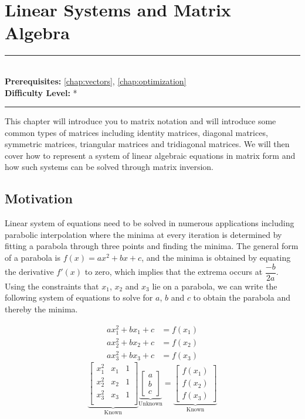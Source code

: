 \documentclass[book.tex]{subfiles}
\begin{document}
\chapter{Linear Systems and Matrix Algebra}
\label{chap:linear_systems}
\noindent\rule{11cm}{0.4pt} \\
\textbf{Prerequisites:} \autoref{chap:vectors}, \autoref{chap:optimization} \\
\textbf{Difficulty Level:} * \\
\noindent\rule{11cm}{0.4pt}
\vspace{5mm}

This chapter will introduce you to matrix notation and will introduce some common types of matrices including identity matrices, diagonal matrices, symmetric matrices, triangular matrices and tridiagonal matrices. We will then cover how to represent a system of linear algebraic equations in matrix form and how such systems can be solved through matrix inversion.

\section{Motivation}

Linear system of equations need to be solved in numerous applications including parabolic interpolation where the minima at every iteration is determined by fitting a parabola through three points and finding the minima. The general form of a parabola is  $f(x) = ax^2+bx+c$, and the minima is obtained by equating the derivative $f'(x)$ to zero, which implies that the extrema occurs at $\dfrac{-b}{2a}$.  Using the constraints that $x_1$, $x_2$ and $x_3$ lie on a parabola, we can write the following system of equations to solve for $a$, $b$ and $c$ to obtain the parabola and thereby the minima.

\begin{align}
ax_1^2 + bx_1 + c &= f(x_1)\\
ax_2^2 + bx_2 + c &= f(x_2)\\
ax_3^2 + bx_3 + c &= f(x_3)
\end{align}
\[	
\underbrace{
	\begin{bmatrix}
	x_1^2 & x_1 & 1 \\
	x_2^2 & x_2 & 1 \\
	x_3^2 & x_3 & 1 \\
	\end{bmatrix}}_{\text{Known}}
\underbrace{
	\begin{bmatrix}
	a\\
	b\\
	c
	\end{bmatrix}}_{\text{Unknown}} = 
\underbrace{
	\begin{bmatrix}
	f(x_1)\\
	f(x_2)\\
	f(x_3)
	\end{bmatrix}}_{\text{Known}}
\]
\end{document}
